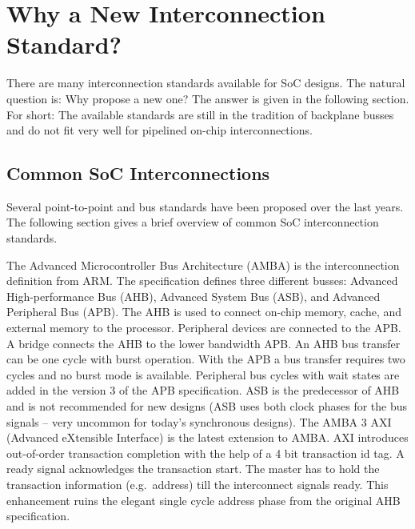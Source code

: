 \section{Why a New Interconnection Standard?}

There are many interconnection standards available for SoC designs.
The natural question is: Why propose a new one? The answer is given
in the following section. For short: The available standards are
still in the tradition of backplane busses and do not fit very well
for pipelined on-chip interconnections.

\subsection{Common SoC Interconnections}


Several point-to-point and bus standards have been proposed over the
last years. The following section gives a brief overview of common
SoC interconnection standards.

The Advanced Microcontroller Bus Architecture (AMBA) \cite{soc:amba}
is the interconnection definition from ARM. The specification
defines three different busses: Advanced High-performance Bus (AHB),
Advanced System Bus (ASB), and Advanced Peripheral Bus (APB). The
AHB is used to connect on-chip memory, cache, and external memory to
the processor. Peripheral devices are connected to the APB. A bridge
connects the AHB to the lower bandwidth APB. An AHB bus transfer can
be one cycle with burst operation. With the APB a bus transfer
requires two cycles and no burst mode is available. Peripheral bus
cycles with wait states are added in the version 3 of the APB
specification. ASB is the predecessor of AHB and is not recommended
for new designs (ASB uses both clock phases for the bus signals --
very uncommon for today's synchronous designs). The AMBA 3 AXI
(Advanced eXtensible Interface) \cite{soc:amba3} is the latest
extension to AMBA. AXI introduces out-of-order transaction
completion with the help of a 4 bit transaction id tag. A ready
signal acknowledges the transaction start. The master has to hold
the transaction information (e.g.\ address) till the interconnect
signals ready. This enhancement ruins the elegant single cycle
address phase from the original AHB specification.

